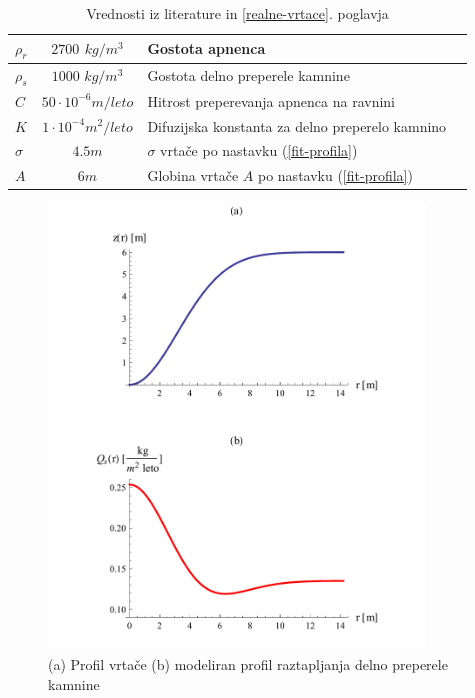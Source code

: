 \documentclass[a4paper, oneside, 12pt]{book}
\begin{document}
\begin{table}[h]
  \centering
  \begin{tabular}{| l | c | l | l |} \hline
    $\rho_r$ & $2700$ $kg/m^3$ & Gostota apnenca                                            \\ \hline
    $\rho_s$ & $1000$ $kg/m^3$ & Gostota delno preperele kamnine                            \\ \hline
    $C$      & $50 \cdot 10^{-6} m/leto$  & Hitrost preperevanja apnenca na ravnini         \\ \hline
    $K$      & $1 \cdot 10^{-4} m^2/leto$ & Difuzijska konstanta za delno preperelo kamnino \\ \hline
    $\sigma$ & $4.5m$ & $\sigma$ vrtače po nastavku (\ref{fit-profila})                     \\ \hline
    $A$      & $6m$ & Globina vrtače $A$ po nastavku (\ref{fit-profila})                    \\ \hline
  \end{tabular}
  \caption{Vrednosti iz literature \cite{Gams1967} \cite{ford2007karst} \cite{fleurant2008modelling} in \ref{realne-vrtace}. poglavja}
  \label{tab:tabela-konstant}
\end{table}

\begin{figure}[H]
  \begin{center}
    \includegraphics[width=10cm]{slike/profil-raztapljanja}
  \end{center}
  \caption{(a) Profil vrtače (b) modeliran profil raztapljanja delno preperele kamnine}
  \label{fig:profil-raztapljanja}
\end{figure}
\end{document}
